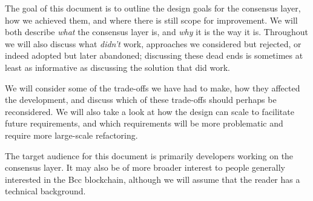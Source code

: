 The goal of this document is to outline the design goals for the consensus
layer, how we achieved them, and where there is still scope for improvement. We
will both describe \emph{what} the consensus layer is, and \emph{why} it is the
way it is. Throughout we will also discuss what \emph{didn't} work, approaches
we considered but rejected, or indeed adopted but later abandoned; discussing
these dead ends is sometimes at least as informative as discussing the solution
that did work.

We will consider some of the trade-offs we have had to make, how they
affected the development, and discuss which of these trade-offs should perhaps
be reconsidered. We will also take a look at how the design can scale to
facilitate future requirements, and which requirements will be more problematic
and require more large-scale refactoring.

The target audience for this document is primarily developers working on the
consensus layer. It may also be of more broader interest to people generally
interested in the Bcc blockchain, although we will assume that the
reader has a technical background.

